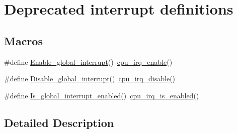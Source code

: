 \hypertarget{group__interrupt__deprecated__group}{\section{Deprecated interrupt definitions}
\label{group__interrupt__deprecated__group}
}
\subsection*{Macros}
\begin{DoxyCompactItemize}
\item 
\#define \hyperlink{group__interrupt__deprecated__group_gaebdc47e7800e11d79b9e5e2da1fecaa6}{Enable\-\_\-global\-\_\-interrupt}()~\hyperlink{group__interrupt__group_gae4922a4bd8ba4150211fbc7f2302403c}{cpu\-\_\-irq\-\_\-enable}()
\item 
\#define \hyperlink{group__interrupt__deprecated__group_ga4834270e1b8984fe025bce15e7ae1564}{Disable\-\_\-global\-\_\-interrupt}()~\hyperlink{group__interrupt__group_ga7b77391ed86e2e027f9ee1dd99a06980}{cpu\-\_\-irq\-\_\-disable}()
\item 
\#define \hyperlink{group__interrupt__deprecated__group_gab7b13c60d26b190e73e540586f1868f8}{Is\-\_\-global\-\_\-interrupt\-\_\-enabled}()~\hyperlink{group__interrupt__group_gae1545a2473614564550b9c4015c94978}{cpu\-\_\-irq\-\_\-is\-\_\-enabled}()
\end{DoxyCompactItemize}


\subsection{Detailed Description}


